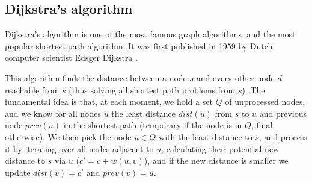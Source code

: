 \subsection{Dijkstra's algorithm} \label{algorithm-shortestpath-dijkstra}
Dijkstra's algorithm is one of the most famous graph algorithms, and the most popular shortest path algorithm. It was first published in 1959 by Dutch computer scientist Edsger Dijkstra \cite{dijkstra}.\par
This algorithm finds the distance between a node $s$ and every other node $d$ reachable from $s$ (thus solving all shortest path problems from $s$). The fundamental idea is that, at each moment, we hold a set $Q$ of unprocessed nodes, and we know for all nodes $u$ the least distance $dist(u)$ from $s$ to $u$ and previous node $prev(u)$ in the shortest path (temporary if the node is in $Q$, final otherwise). We then pick the node $u \in Q$ with the least distance to $s$, and process it by iterating over all nodes adjacent to $u$, calculating their potential new distance to $s$ via $u$ ($c'=c+w(u,v)$), and if the new distance is smaller we update $dist(v)=c'$ and $prev(v)=u$.\par
